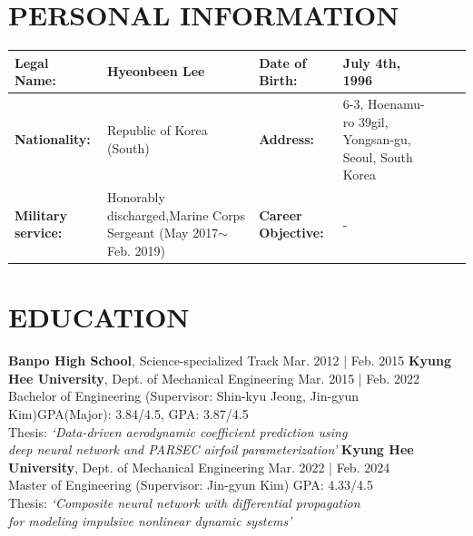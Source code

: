 \documentclass[a4paper,10pt]{extarticle}
\begin{document}
\renewcommand*{\arraystretch}{1.5}
\noindent
\section*{PERSONAL INFORMATION}
\begin{center}
	\vspace*{-0.8cm}
	\noindent
	\begin{longtable}{LRLRLR}
		\textbf{Legal Name:}       & Hyeonbeen Lee                                                                            & \textbf{Date of Birth:}     & July 4th, 1996                                                       \\
		\hline
		\textbf{Nationality:}      & Republic of Korea (South)                                                                & \textbf{Address:}           & 6-3, Hoenamu-ro 39gil, Yongsan-gu, Seoul, South Korea                \\
		\hline
		\textbf{Military service:} & Honorably discharged,\linebreak Marine Corps Sergeant {\small (May 2017$\sim$Feb. 2019)} & \textbf{Career Objective:} & - \\
		\hline
	\end{longtable}
\end{center}

\section*{EDUCATION}
\noindent
\textbf{Banpo High School}, Science-specialized Track \hfill Mar. 2012 | Feb. 2015
\newline
\textbf{Kyung Hee University}, Dept. of Mechanical Engineering \hfill Mar. 2015 | Feb. 2022\\ %
Bachelor of Engineering (Supervisor: Shin-kyu Jeong, Jin-gyun Kim)\hfill GPA(Major): 3.84/4.5, GPA: 3.87/4.5\\ %
Thesis: \textit{{\small `Data-driven aerodynamic coefficient prediction using}}\\
\hspace*{1.3cm}\textit{{\small deep neural
			network and PARSEC airfoil parameterization'}}
\newline
\textbf{Kyung Hee University}, Dept. of Mechanical Engineering \hfill Mar. 2022 | Feb. 2024\\ %
Master of Engineering (Supervisor: Jin-gyun Kim) \hfill GPA: 4.33/4.5\\ %
Thesis: \textit{{\small `Composite neural network with differential propagation}}\\
\hspace*{1.3cm}\textit{\small{for modeling impulsive nonlinear dynamic systems'}}
\end{document}
